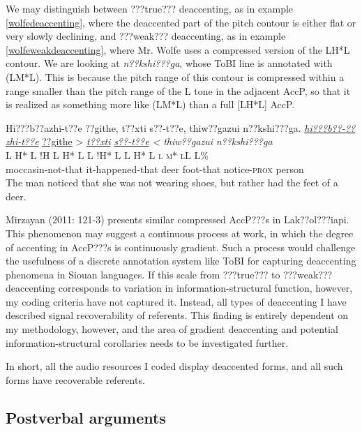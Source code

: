 \documentclass[output=paper]{LSP/langsci}
\begin{document}
We may distinguish between ???true??? deaccenting, as in example \ref{wolfedeaccenting}, where the deaccented part of the pitch contour is either flat or very slowly declining, and ???weak??? deaccenting, as in example \ref{wolfeweakdeaccenting}, where Mr. Wolfe uses a compressed version of the LH*L contour. We are looking at \textit{n??kshi???ga}, whose ToBI line is annotated with (LM*L). This is because the pitch range of this contour is compressed within a range smaller than the pitch range of the L tone in the adjacent AccP, so that it is realized as something more like (LM*L) than a full [LH*L] AccP.

\ea\label{wolfeweakdeaccenting}
Hi???b??azhi-t??e ??githe, t??xti s??-t??e, thiw??gazui n??kshi???ga.\footnotemark
\glll	\emph{\underline{hi???b??-??zhi-t??e}}	{\underline{??githe} >}				\emph{\underline{t??xti}}		\emph{\underline{s??-t??e} <}		\emph{thiw??gazui}	\emph{n??kshi???ga}\\
	{\ob L H* L}					{\cb{}!H}	{\ob L H* L\cb}			{\ob L !H* L\cb}				{\ob L H* L}			{\op \textsc{l m* l}\cp\cb{}L L\%}\\
	moccasin-not-that				it-happened-that					deer					foot-that				notice-\textsc{prox}		person\\
\glt	The man noticed that she was not wearing shoes, but rather had the feet of a deer.
\z

Mirzayan (2011: 121-3) presents similar compressed AccP???s in Lak??ol???iapi. This phenomenon may suggest a continuous process at work, in which the degree of accenting in AccP???s is continuously gradient. Such a process would challenge the usefulness of a discrete annotation system like ToBI for capturing deaccenting phenomena in Siouan languages. If this scale from ???true??? to ???weak??? deaccenting corresponds to variation in information-structural function, however, my coding criteria have not captured it. Instead, all types of deaccenting I have described signal recoverability of referents. This finding is entirely dependent on my methodology, however, and the area of gradient deaccenting and potential information-structural corollaries needs to be investigated further.

In short, all the audio resources I coded display deaccented forms, and all such forms have recoverable referents.

\subsection{Postverbal arguments}\label{postverbalarguments}
\end{document}
